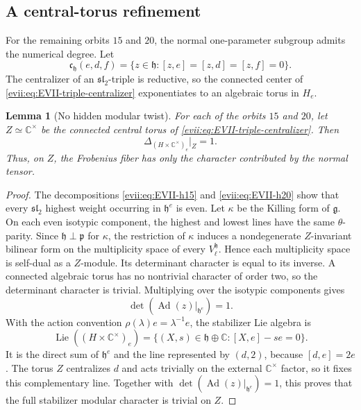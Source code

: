 \documentclass[11pt,reqno]{amsart}
\numberwithin{equation}{section}
\newtheorem{lemma}[theorem]{Lemma}
\theoremstyle{definition}
\theoremstyle{remark}
\newcommand{\C}{\mathbb C}
\newcommand{\Lie}{\operatorname{Lie}}
\newcommand{\Ad}{\operatorname{Ad}}
\newcommand{\fg}{\mathfrak g}
\newcommand{\fh}{\mathfrak h}
\newcommand{\fp}{\mathfrak p}
\begin{document}
\subsection{A central-torus refinement}

For the remaining orbits $15$ and $20$, the normal one-parameter subgroup
admits the numerical degree.  Let
\begin{equation}\label{evii:eq:EVII-triple-centralizer}
 \mathfrak c_{\fh}(e,d,f)
 =\{z\in\fh:[z,e]=[z,d]=[z,f]=0\}.
\end{equation}
The centralizer of an $\mathfrak{sl}_2$-triple is reductive, so the connected
center of \eqref{evii:eq:EVII-triple-centralizer} exponentiates to an algebraic
torus in $H_e$.

\begin{lemma}[No hidden modular twist]\label{evii:lem:EVII-modular-torus}
For each of the orbits $15$ and $20$, let $Z\simeq\C^\times$ be the connected
central torus of \eqref{evii:eq:EVII-triple-centralizer}.  Then
\begin{equation}\label{evii:eq:EVII-modular-Z}
 \Delta_{(H\times\C^\times)_e}|_Z=1.
\end{equation}
Thus, on $Z$, the Frobenius fiber has only the character contributed by the
normal tensor.
\end{lemma}

\begin{proof}
The decompositions \eqref{evii:eq:EVII-h15} and \eqref{evii:eq:EVII-h20} show that
every $\mathfrak{sl}_2$ highest weight occurring in $\fh^e$ is even.  Let
$\kappa$ be the Killing form of $\fg$.  On each even isotypic component, the
highest and lowest lines have the same $\theta$-parity.  Since
$\fh\perp\fp$ for $\kappa$, the restriction of $\kappa$ induces a
nondegenerate $Z$-invariant bilinear form on the multiplicity space of every
$V_\ell^{\fh}$.  Hence each multiplicity space is self-dual as a $Z$-module.
Its determinant character is equal to its inverse.  A connected algebraic
torus has no nontrivial character of order two, so the determinant character
is trivial.  Multiplying over the isotypic components gives
\[
 \det(\Ad(z)|_{\fh^e})=1.
\]
With the action convention $\rho(\lambda)e=\lambda^{-1}e$, the stabilizer
Lie algebra is
\[
 \Lie((H\times\C^\times)_e)
 =\{(X,s)\in\fh\oplus\C:[X,e]-se=0\}.
\]
It is the direct sum of $\fh^e$ and the line represented by $(d,2)$, because
$[d,e]=2e$.  The torus $Z$ centralizes $d$ and acts trivially on the external
$\C^\times$ factor, so it fixes this complementary line.  Together with
$\det(\Ad(z)|_{\fh^e})=1$, this proves that the full stabilizer modular
character is trivial on $Z$.
\end{proof}
\end{document}
